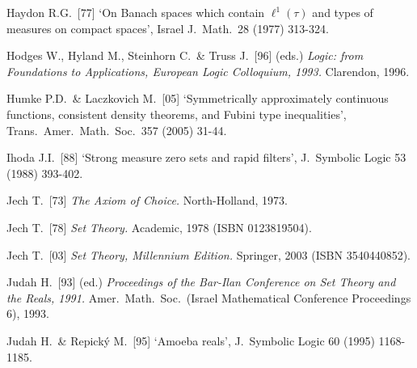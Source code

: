 {\medskip%


Haydon R.G.\ [77] `On Banach spaces which contain $\ell^1(\tau)$ and
types of measures on compact spaces', Israel J.\ Math.\ 28 (1977) 313-324.
\cmmnt{[531E, 531L.]}


Hodges W., Hyland M., Steinhorn C.\ \& Truss J.\ [96] (eds.)
{\it Logic: from Foundations to Applications,
European Logic Colloquium, 1993.}
Clarendon, 1996.

Humke P.D.\ \& Laczkovich M.\ [05] `Symmetrically approximately
continuous functions, consistent density theorems, and Fubini type
inequalities', Trans.\ Amer.\ Math.\ Soc.\ 357 (2005) 31-44.
\cmmnt{[537Q, \S537 {\it notes\/}.]}

\medskip%

Ihoda J.I.\ [88] `Strong measure zero sets and rapid filters',
J.\ Symbolic Logic 53 (1988) 393-402.
\cmmnt{[534Q.]}

\medskip%

Jech T.\ [73] {\it The Axiom of Choice.}  North-Holland, 1973.
\cmmnt{[561A, 561Xc, 561Yc, 561Yi, 564Yd.]}

Jech T.\ [78] {\it Set Theory.}  Academic, 1978 (ISBN 0123819504).

Jech T.\ [03] {\it Set Theory, Millennium Edition.}  Springer, 2003
(ISBN 3540440852).



Judah H.\ [93] (ed.) {\it Proceedings of the Bar-Ilan Conference on Set
Theory and the Reals, 1991.} Amer.\ Math.\ Soc.\ (Israel Mathematical
Conference Proceedings 6), 1993.

Judah H.\ \& Repick\'y M.\ [95] `Amoeba reals', J.\ Symbolic Logic 60 (1995) 1168-1185.
\cmmnt{[528N.]}

}
